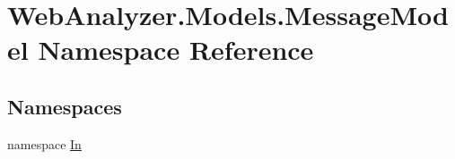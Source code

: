 \hypertarget{namespace_web_analyzer_1_1_models_1_1_message_model}{}\section{Web\+Analyzer.\+Models.\+Message\+Model Namespace Reference}
\label{namespace_web_analyzer_1_1_models_1_1_message_model}
\subsection*{Namespaces}
\begin{DoxyCompactItemize}
\item 
namespace \hyperlink{namespace_web_analyzer_1_1_models_1_1_message_model_1_1_in}{In}
\end{DoxyCompactItemize}
